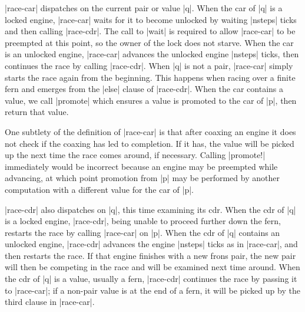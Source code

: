\schemedisplayspace
{}

\wspace

\noindent
\scheme|race-car| dispatches on the current pair or value \scheme|q|.
When the car of \scheme|q| is a locked engine, \scheme|race-car| waits
for it to become unlocked by waiting \scheme|nsteps| ticks and then
calling \scheme|race-cdr|. The call to \scheme|wait| is required to
allow \scheme|race-car| to be preempted at this point, so the owner of
the lock does not starve. When the car is an unlocked engine,
\scheme|race-car| advances the unlocked engine \scheme|nsteps| ticks,
then continues the race by calling \scheme|race-cdr|.  When \scheme|q|
is not a pair, \scheme|race-car| simply starts the race again from the
beginning.  This happens when racing over a finite fern and emerges
from the \scheme|else| clause of \scheme|race-cdr|. When the car
contains a value, we call \scheme|promote| which ensures a value is promoted to
the car of \scheme|p|, then return that value.

One subtlety of the definition of \scheme|race-car| is that after
coaxing an engine it does not check if the coaxing has led to
completion.  If it has, the value will be picked up the next time the
race comes around, if necessary.  Calling \scheme|promote!|
immediately would be incorrect because an engine may be preempted
while advancing, at which point promotion from \scheme|p| may be
performed by another computation with a different value for the car of
\scheme|p|.  


\scheme|race-cdr| also dispatches on \scheme|q|, this time examining its
cdr. When the cdr of \scheme|q| is a locked engine,
\scheme|race-cdr|, being unable to proceed further down the fern,
restarts the race by calling \scheme|race-car| on \scheme|p|. When the
cdr of \scheme|q| contains an unlocked engine, \scheme|race-cdr|
advances the engine \scheme|nsteps| ticks as in \scheme|race-car|, and
then restarts the race. If that engine finishes with a new frons pair,
the new pair will then be competing in the race and will be examined
next time around. When the cdr of \scheme|q| is a value, usually a fern,
\scheme|race-cdr| continues the race by passing it to
\scheme|race-car|; if a non-pair value is at the end of a fern, it will
be picked up by the third clause in \scheme|race-car|.

